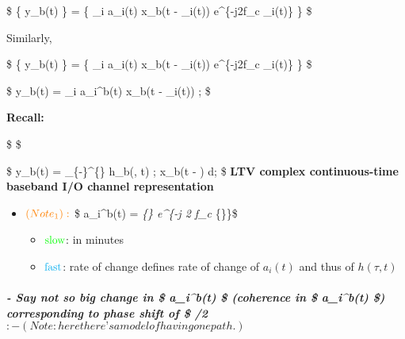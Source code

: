 \documentclass[11pt]{article}
\providecommand{\tightlist}{%
      \setlength{\itemsep}{0pt}\setlength{\parskip}{0pt}}
\begin{document}
{\$ \Rightarrow \Re \{ y\_b(t) \} = \Re \left\{ \sum\limits\_i a\_i(t)
\cdot x\_b(t - \tau\_i(t)) \cdot e\^{}\{-j2\pi f\_c \tau\_i(t)\}
\right\} \quad {} \$

Similarly,

\$ \Im \{ y\_b(t) \cdot {} \} = \Im \left\{
\sum\limits\_i a\_i(t) \cdot x\_b(t - \tau\_i(t))
\cdot {} \cdot e\^{}\{-j2\pi f\_c \tau\_i(t)\}
\right\} \$

\$
\qquad y\_b(t) = \sum\_i a\_i\^{}b(t) \cdot x\_b(t - \tau\_i(t)) ;
\$

    \textbf{Recall:}

\$ 
\qquad \qquad \qquad \qquad {}
\$

\$ \Rightarrow y\_b(t) = \int\limits\_\{-\infty\}\^{}\{\infty\}
h\_b(\tau, t) ; x\_b(t - \tau) d\tau ;
\implies {}
\implies\$ \textbf{LTV complex continuous-time baseband I/O channel
representation}

\begin{itemize}
\tightlist
\item
  \(\color{orange}(Note_1):\) \$ a\_i\^{}b(t) =
  \emph{\{\color{green}\} \cdot e\^{}\{-j
  2 \pi f\_c
  \cdot {}}\{\color{cyan}\}\}\$

  \begin{itemize}
  \tightlist
  \item
    \(\color{green}\text{slow}\): in minutes
  \item
    \(\color{cyan}\text{fast}\): rate of change defines rate of change
    of \(a_i(t)\) and thus of \(h(\tau, t)\)
  \end{itemize}
\end{itemize}

\subparagraph{\texorpdfstring{- Say not so big change in \$ a\_i\^{}b(t)
\$ (coherence in \$ a\_i\^{}b(t) \$) corresponding to \textbf{phase
shift} of \$ \pi/2 \(:
        - (Note: here there’s a model of having one path.)\)}{- Say not so big change in \$ a\_i\^{}b(t) \$ (coherence in \$ a\_i\^{}b(t) \$) corresponding to phase shift of \$ /2 :
        - (Note: here there's a model of having one path.)}}\label{say-not-so-big-change-in-a_ibt-coherence-in-a_ibt-corresponding-to-phase-shift-of-2---note-here-theres-a-model-of-having-one-path.}

}
\end{document}
